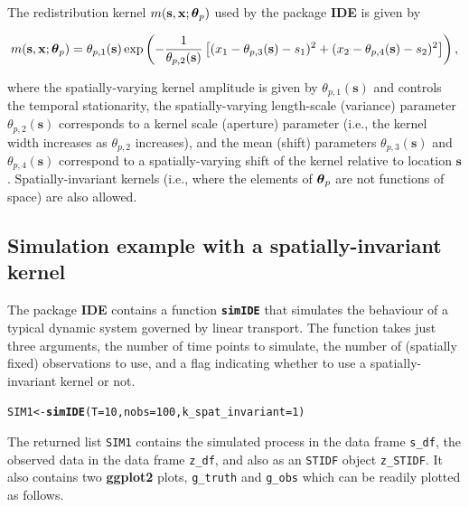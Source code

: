 \documentclass{article}\usepackage[]{graphicx}\usepackage[]{color}
\makeatletter
\newcommand{\hlnum}[1]{\textcolor[rgb]{0.686,0.059,0.569}{#1}}%
\newcommand{\hlstd}[1]{\textcolor[rgb]{0.345,0.345,0.345}{#1}}%
\newcommand{\hlkwb}[1]{\textcolor[rgb]{0.69,0.353,0.396}{#1}}%
\newcommand{\hlkwc}[1]{\textcolor[rgb]{0.333,0.667,0.333}{#1}}%
\newcommand{\hlkwd}[1]{\textcolor[rgb]{0.737,0.353,0.396}{\textbf{#1}}}%
\newenvironment{kframe}{%
 \def\at@end@of@kframe{}%
 \ifinner\ifhmode%
  \def\at@end@of@kframe{\end{minipage}}%
  \begin{minipage}{\columnwidth}%
 \fi\fi%
 \def\FrameCommand##1{\hskip\@totalleftmargin \hskip-\fboxsep
 \colorbox{shadecolor}{##1}\hskip-\fboxsep
     \hskip-\linewidth \hskip-\@totalleftmargin \hskip\columnwidth}%
 \MakeFramed {\advance\hsize-\width
   \@totalleftmargin\z@ \linewidth\hsize
   \@setminipage}}%
 {\par\unskip\endMakeFramed%
 \at@end@of@kframe}
\newenvironment{knitrout}{}{} %
\def\bs{\mathbf{s}}
\def\bx{\mathbf{x}}
\newcommand{\bftheta}{\mbox{\boldmath $\theta$}}
\newcommand{\fn}[1]{\texttt{\hlkwd{#1}}}
\newcommand{\cc}[1]{\texttt{#1}}
\makeatother
\begin{document}
The redistribution kernel $m(\bs,\bx;\bftheta_p)$ used by the package {\bf IDE} is given by

\begin{equation}
m(\bs,\bx;\bftheta_p) = {\theta_{p,1}(\bs)} \exp\left(-\frac{1}{\theta_{p,2}(\bs)}\left[(x_1 - \theta_{p,3}(\bs) - s_1)^2 + (x_2 - \theta_{p,4}(\bs) - s_2)^2 \right] \right),
\label{eq:Gausskern}
\end{equation}

\noindent where the spatially-varying kernel amplitude is given by $\theta_{p,1}(\bs)$ and controls the temporal stationarity, the spatially-varying length-scale (variance) parameter $\theta_{p,2}(\bs)$ corresponds to a kernel scale (aperture) parameter (i.e., the kernel width increases as $\theta_{p,2}$ increases), and the mean (shift) parameters $\theta_{p,3}(\bs)$ and $\theta_{p,4}(\bs)$ correspond to a spatially-varying shift of the kernel relative to location $\bs$. Spatially-invariant kernels (i.e., where the elements of $\bftheta_p$ are not functions of space) are also allowed.

\subsection*{Simulation example with a spatially-invariant kernel}

The package {\bf IDE} contains a function \fn{simIDE} that simulates the behaviour of a typical dynamic system governed by linear transport. The function takes just three arguments, the number of time points to simulate, the number of (spatially fixed) observations to use, and a flag indicating whether to use a spatially-invariant kernel or not.

\begin{knitrout}
\color{fgcolor}\begin{kframe}
\begin{alltt}
\hlstd{SIM1} \hlkwb{<-} \hlkwd{simIDE}\hlstd{(}\hlkwc{T} \hlstd{=} \hlnum{10}\hlstd{,} \hlkwc{nobs} \hlstd{=} \hlnum{100}\hlstd{,} \hlkwc{k_spat_invariant} \hlstd{=} \hlnum{1}\hlstd{)}
\end{alltt}
\end{kframe}
\end{knitrout}

\noindent The returned list \cc{SIM1} contains the simulated process in the data frame \cc{s\_df}, the observed data in the data frame \cc{z\_df}, and also as an \cc{STIDF} object \cc{z\_STIDF}. It also contains two {\bf ggplot2} plots, \cc{g\_truth} and \cc{g\_obs} which can be readily plotted as follows.
\end{document}
